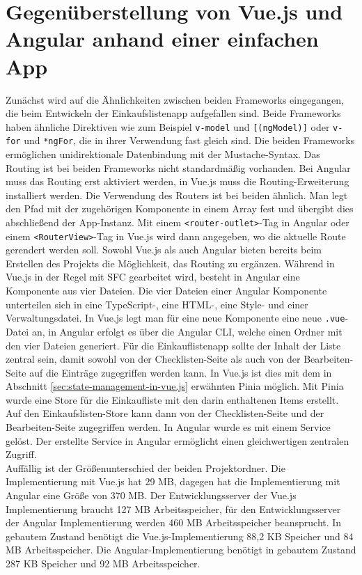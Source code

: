 \section{Gegenüberstellung von Vue.js und Angular anhand einer einfachen App}
Zunächst wird auf die Ähnlichkeiten zwischen beiden Frameworks eingegangen, die beim Entwickeln der Einkaufslistenapp aufgefallen sind.
Beide Frameworks haben ähnliche Direktiven wie zum Beispiel \texttt{v-model} und \texttt{[(ngModel)]} oder \texttt{v-for} und \texttt{*ngFor},
die in ihrer Verwendung fast gleich sind.
Die beiden Frameworks ermöglichen unidirektionale Datenbindung mit der Mustache-Syntax.
Das Routing ist bei beiden Frameworks nicht standardmäßig vorhanden.
Bei Angular muss das Routing erst aktiviert werden, in Vue.js muss die Routing-Erweiterung installiert werden.
Die Verwendung des Routers ist bei beiden ähnlich.
Man legt den Pfad mit der zugehörigen Komponente in einem Array fest
und übergibt dies abschließend der App-Instanz.
Mit einem \texttt{<router-outlet>}-Tag in Angular oder einem \texttt{<RouterView>}-Tag in Vue.js wird dann angegeben, wo die aktuelle Route gerendert werden soll.
Sowohl Vue.js als auch Angular bieten bereits beim Erstellen des Projekts die Möglichkeit, das Routing zu ergänzen.
Während in Vue.js in der Regel mit SFC gearbeitet wird, besteht in Angular eine Komponente aus vier Dateien.
Die vier Dateien einer Angular Komponente unterteilen sich in eine TypeScript-, eine HTML-, eine Style- und einer Verwaltungsdatei.
In Vue.js legt man für eine neue Komponente eine neue \texttt{.vue}-Datei an,
in Angular erfolgt es über die Angular CLI, welche einen Ordner mit den vier Dateien generiert.
Für die Einkauflistenapp sollte der Inhalt der Liste zentral sein, damit sowohl von der Checklisten-Seite als auch von der Bearbeiten-Seite
auf die Einträge zugegriffen werden kann.
In Vue.js ist dies mit dem in Abschnitt \ref{sec:state-management-in-vue.js} erwähnten Pinia möglich.
Mit Pinia wurde eine Store für die Einkaufliste mit den darin enthaltenen Items erstellt.
Auf den Einkaufslisten-Store kann dann von der Checklisten-Seite und der Bearbeiten-Seite zugegriffen werden.
In Angular wurde es mit einem Service gelöst.
Der erstellte Service in Angular ermöglicht einen gleichwertigen zentralen Zugriff.
\\
Auffällig ist der Größenunterschied der beiden Projektordner.
Die Implementierung mit Vue.js hat 29 MB, dagegen hat die Implementierung mit Angular eine Größe von 370 MB.
Der Entwicklungsserver der Vue.js Implementierung braucht 127 MB Arbeitsspeicher, für den Entwicklungsserver der Angular Implementierung
werden 460 MB Arbeitsspeicher beansprucht.
In gebautem Zustand benötigt die Vue.js-Implementierung 88,2 KB Speicher und 84 MB Arbeitsspeicher.
Die Angular-Implementierung benötigt in gebautem Zustand 287 KB Speicher und 92 MB Arbeitsspeicher.



